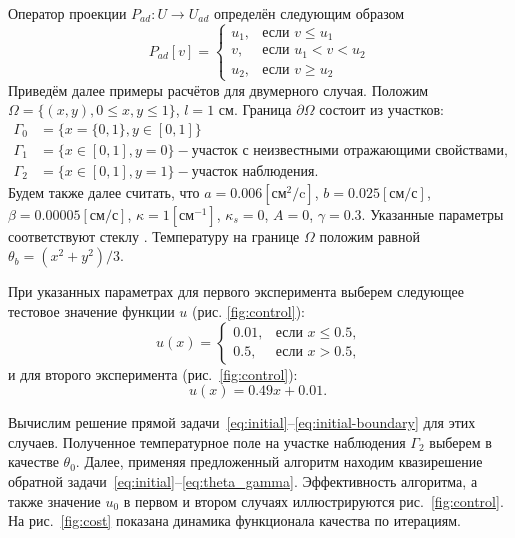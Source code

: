 Оператор проекции $P_{ad} : U \to U_{ad}$ определён следующим образом
\[
    P_{ad}[v] =
    \begin{cases}
        u_1, & \text{если } v \le u_1 \\
        v, & \text{если } u_1 < v < u_2 \\
        u_2, & \text{если } v \ge u_2
    \end{cases}
\]
Приведём далее примеры расчётов для двумерного случая.
Положим $\Omega = \{(x,y), 0 \leq x,y \leq 1\}$, $l = 1$ см.
Граница $\partial\Omega$ состоит из участков:
\[
    \begin{aligned}
        \Gamma_0 & = \{x=\{0,1\}, y \in [0,1]\} \\
        \Gamma_1 & = \{x\in [0,1], y=0\} - \text{участок с неизвестными отражающими свойствами,} \\
        \Gamma_2 & = \{x \in [0,1], y=1\} - \text{участок наблюдения.}
    \end{aligned}
\]
Будем также далее считать, что $a = 0.006[\text{см}^2/\text{c}]$, $b=0.025[\text{см}/\text{с}]$,
$\beta = 0.00005[\text{см}/\text{с}]$, $\kappa=1[\text{см}^{-1}]$, $\kappa_s = 0$, $A = 0$, $\gamma = 0.3$.
Указанные параметры соответствуют стеклу \cite{grenkin_13}.
Температуру на границе $\Omega$ положим равной $\theta_b = (x^2+y^2)/3$.

При указанных параметрах для первого эксперимента выберем следующее тестовое значение
функции $u$ (рис. \ref{fig:control}):
\begin{equation}
    u(x)=
    \begin{cases}
        0.01, & \text{если } x \le 0.5, \\
        0.5, & \text{если } x > 0.5,
    \end{cases}\label{eq:equation}
\end{equation}
и для второго эксперимента (рис.~\ref{fig:control}):
\begin{equation}
    \label{eq:test_function_1}
    u(x)=0.49x+0.01. \;
\end{equation}

Вычислим решение прямой задачи~\eqref{eq:initial}--\eqref{eq:initial-boundary} для этих случаев.
Полученное температурное поле на участке наблюдения $\Gamma_2$ выберем в качестве $\theta_0$.
Далее, применяя предложенный алгоритм находим квазирешение
обратной задачи~\eqref{eq:initial}--\eqref{eq:theta_gamma}.
Эффективность алгоритма, а также значение $u_0$ в первом и
втором случаях иллюстрируются рис.~\ref{fig:control}.
На рис.~\ref{fig:cost} показана динамика функционала качества по итерациям.

